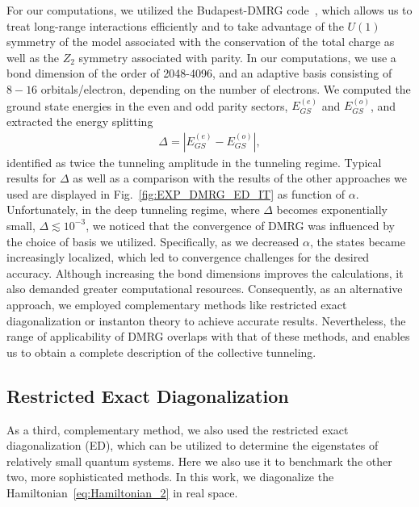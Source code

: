 \documentclass[aps, prb, floatfix, twocolumn, notitlepage, superscriptaddress, 10pt]{revtex4-2}
\newcommand{\ket}[1]{|#1\rangle}
\newcommand{\bchi}{\boldsymbol \chi}
\newcommand{\1}{{1\hspace*{-0.5ex} \textrm{l} \hspace*{0.5ex}}}
\begin{document}
For our computations,  we utilized the Budapest-DMRG code~\cite{Ors,legeza1996accuracy, Ors2016},
which allows us to treat long-range interactions efficiently and to take advantage of the $U(1)$ 
symmetry of the model associated with the conservation of the total charge as well as  the $Z_2$ 
symmetry associated with  parity. In our computations, we use a bond dimension of the order of   2048-4096,  and
an adaptive basis consisting of  $8-16$ 
orbitals/electron, depending on the number of electrons. 
We  computed the ground state energies in the even and odd parity sectors,  $E_{GS}^{(e)}$ and $E_{GS}^{(o)}$, and 
extracted the energy splitting
\begin{gather}
	\Delta  = |E_{GS}^{(e)}-E_{GS}^{(o)}|,\label{eq:gap}
\end{gather} 
identified as twice the tunneling amplitude in the tunneling regime. 
Typical results for $\Delta$ as well as  a comparison with the results of the  other  approaches 
we used are displayed in Fig.~\ref{fig:EXP_DMRG_ED_IT} as function of $\alpha$. Unfortunately, 
in the deep tunneling regime, where     $\Delta $ becomes
exponentially small, $\Delta\lesssim 10^{-3}$, 
we noticed that the convergence of DMRG was influenced by the choice of basis we utilized. Specifically, as we decreased $\alpha$, the states became increasingly localized, which led to convergence challenges for the desired accuracy. Although increasing the bond dimensions improves the calculations, it also demanded greater computational resources. Consequently, as an alternative approach, we employed complementary methods like restricted exact diagonalization or instanton theory to achieve accurate results.
Nevertheless, the range of applicability of DMRG overlaps with that of these methods, and 
enables us to obtain a complete description of the collective tunneling. 

\subsection{Restricted Exact Diagonalization}\label{sec:ED}
As a third,  complementary method, we also used the restricted exact diagonalization (ED),  which can be  utilized to determine the 
 eigenstates of relatively small quantum systems. Here we also  use it to benchmark the other two,  more sophisticated 
 methods.
In this work, we  diagonalize the Hamiltonian~\eqref{eq:Hamiltonian_2} in real space. 

\end{document}
